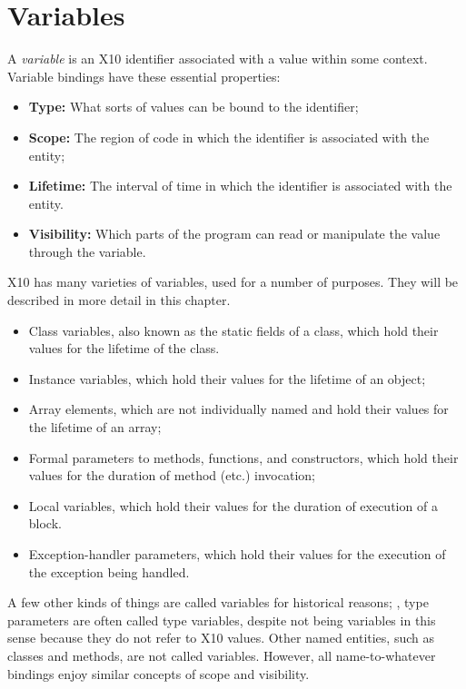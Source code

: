 
\chapter{Variables}\label{XtenVariables}


A {\em variable} is an X10 identifier associated with a value within some
context. Variable bindings have these essential properties:
\begin{itemize}
\item {\bf Type:} What sorts of values can be bound to the identifier;
\item {\bf Scope:} The region of code in which the identifier is associated
      with the entity;
\item {\bf Lifetime:} The interval of time in which the identifier is
      associated with the entity.
\item {\bf Visibility:} Which parts of the program can read or manipulate the
      value through the variable.
\end{itemize}



X10 has many varieties of variables, used for a number of purposes. They will
be described in more detail in this chapter.  
\begin{itemize}
\item Class variables, also known as the static fields of a class, which hold
      their values for the lifetime of the class.  
\item Instance variables, which hold their values for the lifetime of an
      object;
\item Array elements, which are not individually named and hold their values
      for the lifetime of an array;
\item Formal parameters to methods, functions, and constructors, which hold
      their values for the duration of method (etc.) invocation;
\item Local variables, which hold their values for the duration of execution
      of a block.
\item Exception-handler parameters, which hold their values for the execution
      of the exception being handled. 
\end{itemize}
A few other kinds of things are called variables for historical reasons; \eg,
type parameters are often called type variables, despite not being variables
in this sense because they do not refer to X10 values.  Other named entities,
such as classes and methods, are not called variables.  However, all
name-to-whatever bindings enjoy similar concepts of scope and visibility.  

